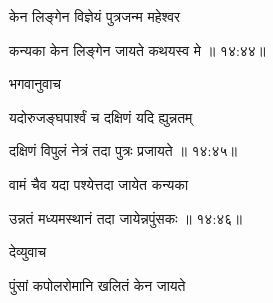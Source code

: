 {\devanagarifont केन लिङ्गेन विज्ञेयं पुत्रजन्म महेश्वर \thinspace{\danda} \dontdisplaylinenum }%
 

{\devanagarifont कन्यका केन लिङ्गेन जायते कथयस्व मे {॥ १४:४४॥} \veg\dontdisplaylinenum }%

{\devanagarifont भगवानुवाच {\dandab}\dontdisplaylinenum  }%
 
{\devanagarifont यदोरुजङ्घपार्श्वं च दक्षिणं यदि ह्युन्नतम् \thinspace{\danda} \dontdisplaylinenum }%


{\devanagarifont दक्षिणं विपुलं नेत्रं तदा पुत्रः प्रजायते {॥ १४:४५॥} \veg\dontdisplaylinenum }%

{\devanagarifont वामं चैव यदा पश्येत्तदा जायेत कन्यका \thinspace{\dandab} \dontdisplaylinenum }%


{\devanagarifont उन्नतं मध्यमस्थानं तदा जायेन्नपुंसकः {॥ १४:४६॥} \veg\dontdisplaylinenum }%

{\devanagarifont देव्युवाच {\dandab}\dontdisplaylinenum  }%
 
{\devanagarifont पुंसां कपोलरोमानि खलितं केन जायते \thinspace{\danda} \dontdisplaylinenum }%



